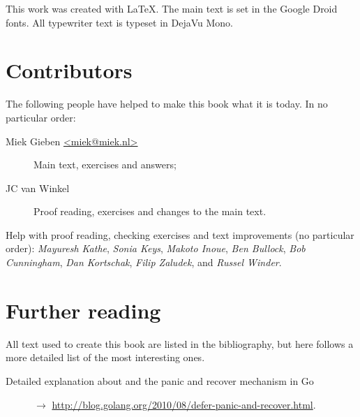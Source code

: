 \noindent{}This work was created with \LaTeX. The main text is set in
the Google Droid fonts. All typewriter text is typeset in DejaVu Mono.

\section{Contributors}
The following people have helped to make this book what it is today.
In no particular order:
\begin{description}
\item[Miek Gieben \qquad\url{<miek@miek.nl>}] 
{Main text, exercises and answers;}
\item[JC van Winkel]
{Proof reading, exercises and changes to the main text.}
\end{description}

Help with proof reading, checking exercises and text improvements (no
particular order):
\emph{Mayuresh Kathe},
\emph{Sonia Keys},
\emph{Makoto Inoue},
\emph{Ben Bullock},
\emph{Bob Cunningham},
\emph{Dan Kortschak},
\emph{Filip Zaludek},
and \emph{Russel Winder}.

\section{Further reading}
All text used to create this book are listed in the bibliography, but
here follows a more detailed list of the most interesting ones.
\begin{description}
\item[Detailed explanation about  and the panic and recover
mechanism in Go]{$\rightarrow$
\url{http://blog.golang.org/2010/08/defer-panic-and-recover.html}.}
\end{description}
